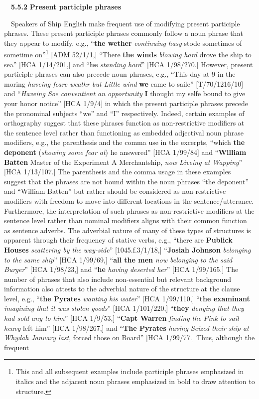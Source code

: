 \begin{styleStandard}
\ \ \textbf{5.5.2} \textbf{Present participle phrases }
\end{styleStandard}

\begin{styleStandard}
\ \ Speakers of Ship English make frequent use of modifying present participle phrases. These present participle phrases commonly follow a noun phrase that they appear to modify, e.g., “\textbf{the wether} \textit{continuing hasy} stode sometimes of sometime on”\footnote{ This and all subsequent examples include participle phrases emphasized in italics and the adjacent noun phrases emphasized in bold to draw attention to structure.} [ADM 52/1/1,] “There \textbf{the winds} \textit{blowing hard} drove the ship to sea” [HCA 1/14/201,] and “\textbf{he} \textit{standing hard}” [HCA 1/98/270.] However, present participle phrases can also precede noun phrases, e.g., “This day at 9 in the moring \textit{haveing feare weathr but Little wind }\textbf{we }came to saile” [T/70/1216/10] and “\textit{Haveing Soe conventient an opportunity}\textbf{ I} thought my selfe bound to give your honor notice” [HCA 1/9/4] in which the present participle phrases precede the pronominal subjects “we” and “I” respectively. Indeed, certain examples of orthography suggest that these phrases function as non-restrictive modifiers at the sentence level rather than functioning as embedded adjectival noun phrase modifiers, e.g., the parenthesis and the comma use in the excerpts, “which \textbf{the deponent} (\textit{showing some fear at}) he answered” [HCA 1/99/84] and “\textbf{William Batten} Master of the Experiment A Merchantship, \textit{now Liveing at Wapping}” [HCA 1/13/107.] The parenthesis and the comma usage in these examples suggest that the phrases are not bound within the noun phrases “the deponent” and “William Batten” but rather should be considered as non-restrictive modifiers with freedom to move into different locations in the sentence/utterance. Furthermore, the interpretation of such phrases as non-restrictive modifiers at the sentence level rather than nominal modifiers aligns with their common function as sentence adverbs. The adverbial nature of many of these types of structures is apparent through their frequency of stative verbs, e.g., “there are \textbf{Publick Houses} \textit{scattering by the way-side}” [1045.f.3/1/18,] “\textbf{Josiah Johnson} \textit{belonging to the same ship}” [HCA 1/99/69,] “\textbf{all the men} \textit{now belonging to the said Burger}” [HCA 1/98/23,] and “\textbf{he} \textit{having deserted her}” [HCA 1/99/165.] The number of phrases that also include non-essential but relevant background information also attests to the adverbial nature of the structure at the clause level, e.g., “\textbf{the Pyrates} \textit{wanting his water}” [HCA 1/99/110,] “\textbf{the examinant} \textit{imagining that it was stolen goods}” [HCA 1/101/220,] “\textbf{they} \textit{denying that they had sold any to him}” [HCA 1/9/53,] “\textbf{Capt Warren}\textit{ finding the Pink to sail heavy }left him” [HCA 1/98/267,] and “\textbf{The Pyrates} \textit{having Seized their ship at Whydah January last}, forced those on Board” [HCA 1/99/77.] Thus, although the frequent 
\end{styleStandard}
